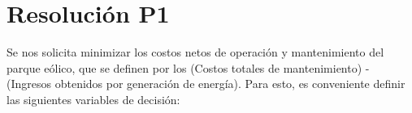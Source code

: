 \section*{Resolución P1}

Se nos solicita minimizar los costos netos de operación y mantenimiento del parque eólico,
que se definen por los (Costos totales de mantenimiento) - (Ingresos obtenidos por generación
de energía). Para esto, es conveniente definir las siguientes variables de decisión:

